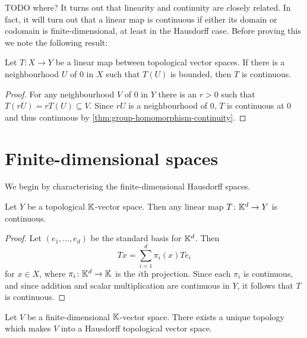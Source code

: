 \documentclass[article, a4paper, 11pt, oneside]{memoir}
\numberwithin{equation}{chapter}
\begin{document}
TODO where? It turns out that linearity and continuity are closely related. In fact, it will turn out that a linear map is continuous if either its domain or codomain is finite-dimensional, at least in the Hausdorff case. Before proving this we note the following result:

\begin{lemma}
    \label{thm:bounded-around-0-implies-continuous}
    Let $T \colon X \to Y$ be a linear map between topological vector spaces. If there is a neighbourhood $U$ of $0$ in $X$ such that $T(U)$ is bounded, then $T$ is continuous.
\end{lemma}

\begin{proof}
    For any neighbourhood $V$ of $0$ in $Y$ there is an $r > 0$ such that $T(rU) = rT(U) \subseteq V$. Since $rU$ is a neighbourhood of $0$, $T$ is continuous at $0$ and thus continuous by \cref{thm:group-homomorphism-continuity}.
\end{proof}




\section{Finite-dimensional spaces}

\newcommand{\eu}{\mathrm{eu}}

We begin by characterising the finite-dimensional Hausdorff spaces.

\begin{lemma}
    Let $Y$ be a topological $\mathbb{K}$-vector space. Then any linear map $T \colon \mathbb{K}^d \to Y$ is continuous.
\end{lemma}

\begin{proof}
    Let $(e_1, \ldots, e_d)$ be the standard basis for $\mathbb{K}^d$. Then
    \begin{equation*}
        Tx = \sum_{i=1}^d \pi_i(x) Te_i
    \end{equation*}
    for $x \in X$, where $\pi_i \colon \mathbb{K}^d \to \mathbb{K}$ is the $i$th projection. Since each $\pi_i$ is continuous, and since addition and scalar multiplication are continuous in $Y$, it follows that $T$ is continuous.
\end{proof}


\begin{theorem}
    Let $V$ be a finite-dimensional $\mathbb{K}$-vector space. There exists a unique topology which makes $V$ into a Hausdorff topological vector space.
\end{theorem}
\end{document}
